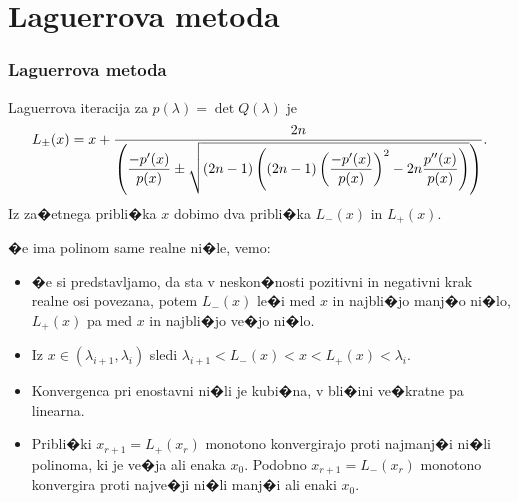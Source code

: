 \documentclass[9pt]{beamer}
\begin{document}
\section{Laguerrova metoda}
\begin{frame}
\frametitle{Laguerrova metoda}

Laguerrova iteracija za $p(\lambda)=\det Q(\lambda)$ je
$$
  L_{\pm}(x)=x+{2n\over \left(\displaystyle{-p'(x)\over p(x)}\pm
  \sqrt{(2n-1)\left((2n-1)\left(
    \displaystyle{-p'(x)\over p(x)}\right)^2
    -2n\displaystyle{p''(x)\over p(x)}\right)}\right)}.
$$
Iz za�etnega pribli�ka $x$ dobimo dva pribli�ka
$L_{-}(x)$ in $L_{+}(x)$.\vspace{1em}\pause

�e ima polinom same realne ni�le, vemo:
\begin{itemize}
\item �e si predstavljamo, da sta v neskon�nosti
pozitivni in negativni krak realne osi  povezana, potem 
$L_{-}(x)$ le�i
med $x$ in najbli�jo manj�o ni�lo,
$L_{+}(x)$ pa med $x$ in najbli�jo ve�jo ni�lo.\pause
\item Iz $x\in(\lambda_{i+1},\lambda_i)$  sledi
$\lambda_{i+1}<L_{-}(x)<x<L_{+}(x)<\lambda_i$.\pause
\item Konvergenca pri enostavni ni�li je \alert{kubi�na}, v bli�ini
      ve�kratne pa linearna.\pause
\item Pribli�ki
      $x_{r+1}=L_{+}(x_r)$ monotono konvergirajo proti najmanj�i ni�li
      polinoma, ki je ve�ja ali enaka $x_0$. Podobno 
      $x_{r+1}=L_{-}(x_r)$ monotono konvergira proti najve�ji ni�li
      manj�i ali enaki $x_0$. 
\end{itemize}

\end{frame}
\end{document}
